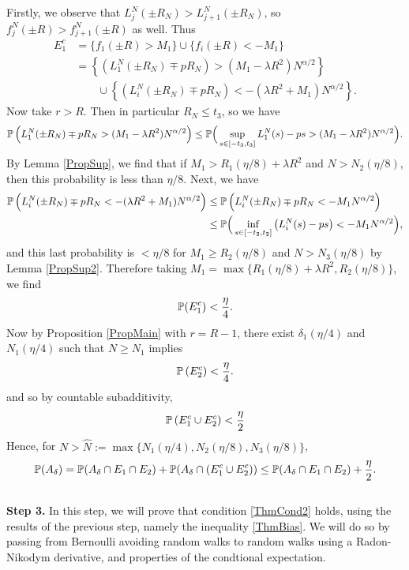 	Firstly, we observe that $L_j^N(\pm R_N)> L_{j+1}^N(\pm R_N)$, so $f_j^N(\pm R)>f_{j+1}^N(\pm R)$ as well. Thus
	\begin{align*}
	E_1^c &= \{f_1(\pm R)> M_1\} \cup \{f_i(\pm R)<-M_1\} \\
	&= \left\{ \left(L_1^N(\pm R_N)\mp pR_N\right)> (M_1-\lambda R^2)N^{\alpha/2}\right\}\\
	&\qquad \cup \left\{\left(L_i^N(\pm R_N)\mp pR_N\right)< -(\lambda R^2+M_1)N^{\alpha/2}\right\}.
	\end{align*}
	Now take $r>R$. Then in particular $R_N \leq t_3$, so we have $$
	\mathbb{P}\left(L_1^N(\pm R_N)\mp pR_N>(M_1-\lambda R^2)N^{\alpha/2}\right)
	\leq\mathbb{P}\Big(\sup_{s\in[-t_3,t_3]}L_1^N(s)-ps>(M_1-\lambda R^2)N^{\alpha/2}\Big).
	$$ By Lemma \ref{PropSup}, we find that if $M_1>R_1(\eta/8)+\lambda R^2$ and $N>N_2(\eta/8)$, then this probability is less than $\eta/8$. Next, we have
	\begin{align*}
	\mathbb{P} \left(L_i^N(\pm R_N)\mp pR_N< -(\lambda R^2+M_1)N^{\alpha/2}\right)&\leq \mathbb{P} \left(L_i^N(\pm R_N)\mp pR_N< -M_1N^{\alpha/2}\right)\\
	&\leq \mathbb{P}\Big(\inf_{s\in[-t_2,t_2]}\big(L_i^N(s)-ps\big)<-M_1N^{\alpha/2}\Big),
	\end{align*}
	and this last probability is $<\eta/8$ for $M_1\geq R_2(\eta/8)$ and $N>N_3(\eta/8)$ by Lemma \ref{PropSup2}. Therefore taking $M_1=\max\{R_1(\eta/8)+\lambda R^2,R_2(\eta/8)\}$, we find $$\mathbb{P}(E_1^c)<\frac{\eta}{4}.$$
	Now by Proposition \ref{PropMain} with $r=R-1$, there exist $\delta_1(\eta/4)$ and $N_1(\eta/4)$ such that $N\geq N_1$ implies 
	\[
	\mathbb{P}\left( E_2^c\right)<\frac{\eta}{4}.
	\]
	and so by countable subadditivity, 
	\[
	\mathbb{P}\left(E_1^c\cup E_2^c\right)<\frac{\eta}{2}
	\]
	Hence, for $N>\hat N:= \max\{N_1(\eta/4),N_2(\eta/8),N_3(\eta/8)\}$, 
	\begin{equation}
	\mathbb{P}(A_\delta)= \mathbb{P}(A_\delta\cap E_1\cap E_2)+\mathbb{P}(A_\delta\cap\left(E_1^c\cup E_2^c\right))\leq \mathbb{P}(A_\delta\cap E_1\cap E_2)+\frac{\eta}{2}. \label{ThmBias}
	\end{equation}\\
	
	\noindent\textbf{Step 3.} In this step, we will prove that condition \ref{ThmCond2} holds, using the results of the previous step, namely the inequality \ref{ThmBias}. We will do so by passing from Bernoulli avoiding random walks to random walks using a Radon-Nikodym derivative, and properties of the condtional expectation. 
	
